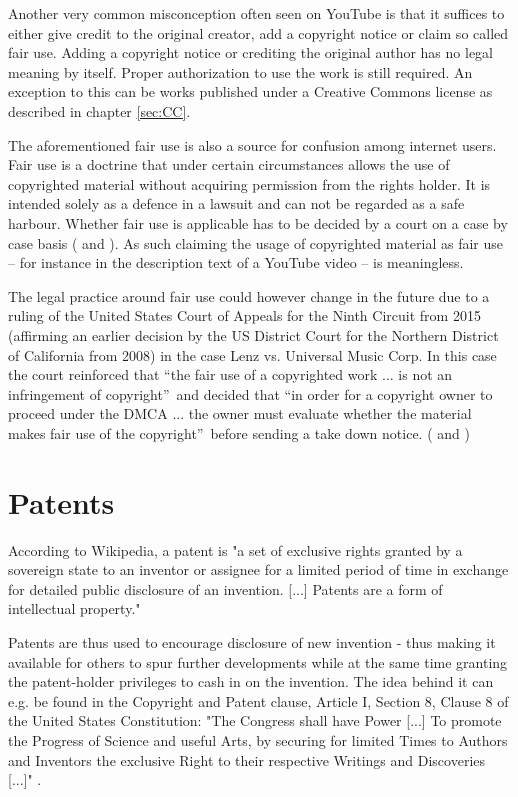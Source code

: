 \documentclass[a4paper]{report}
\begin{document}
Another very common misconception often seen on YouTube is that it suffices to either give credit to the original creator, add a copyright notice or claim so called fair use. \parencite{Vorys2013} Adding a copyright notice or crediting the original author has no legal meaning by itself. Proper authorization to use the work is still required. An exception to this can be works published under a Creative Commons license as described in chapter \ref{sec:CC}.

The aforementioned fair use is also a source for confusion among internet users. Fair use is a doctrine that under certain circumstances allows the use of copyrighted material without acquiring permission from the rights holder. It is intended solely as a defence in a lawsuit and can not be regarded as a safe harbour. Whether fair use is applicable has to be decided by a court on a case by case basis (\cite{WikiFair} and \cite{Vorys2013}). As such claiming the usage of copyrighted material as fair use -- for instance in the description text of a YouTube video -- is meaningless.

The legal practice around fair use could however change in the future due to a ruling of the United States Court of Appeals for the Ninth Circuit from 2015 (affirming an earlier decision by the US District Court for the Northern District of California from 2008) in the case Lenz vs. Universal Music Corp. In this case the court reinforced that \textquotedblleft the fair use of a copyrighted work ... is not an infringement of copyright\textquotedblright\ and decided that \textquotedblleft in order for a copyright owner to proceed under the DMCA ... the owner must evaluate whether the material makes fair use of the copyright\textquotedblright\ before sending a take down notice. (\cite{LenzUniversal} and \cite{WikiLenzUniversal})

\section{Patents}
\label{sec:Patents}
According to Wikipedia, a patent is "a set of exclusive rights granted by a sovereign state to an inventor or assignee for a limited period of time in exchange for detailed public disclosure of an invention. [...]  Patents are a form of intellectual property." \parencite{WikiPatent2017}

Patents are thus used to encourage disclosure of new invention - thus making it available for others to spur further developments while at the same time granting the patent-holder privileges to cash in on the invention. The idea behind it can e.g. be found in the Copyright and Patent clause, Article I, Section 8, Clause 8 of the United States Constitution: "The Congress shall have Power [...] To promote the Progress of Science and useful Arts, by securing for limited Times to Authors and Inventors the exclusive Right to their respective Writings and Discoveries [...]" \parencite{Washington1787}.
\end{document}
